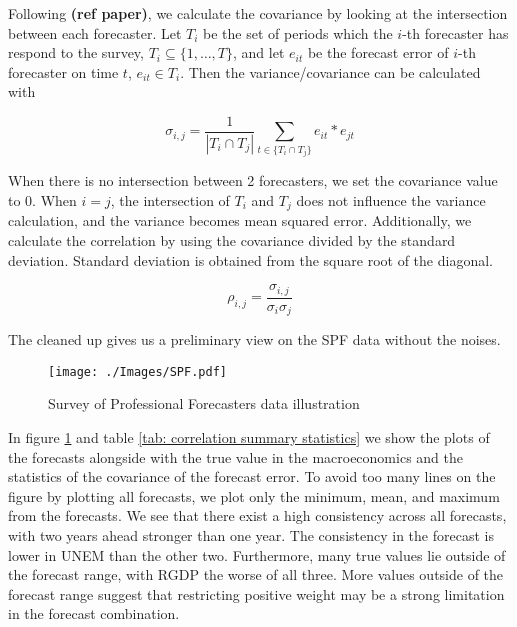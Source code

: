 \documentclass[11pt]{article}
\begin{document}
Following \textbf{(ref paper)}, we calculate the covariance by looking
at the intersection between each forecaster. Let $T_i$ be the set of periods which the $i$-th forecaster has respond to the survey, $T_i \subseteq \{1,\ldots,T\}$, and let $e_{it}$ be the forecast error of $i$-th forecaster on time $t$, $e_{it} \in T_i$. Then the variance/covariance can be calculated with

\begin{equation}
\label{equation}
\sigma_{i,j} = \frac{1}{|T_i \cap T_j|}\sum_{t\in \{T_i \cap T_j\}} e_{it}*e_{jt}
\end{equation}

When there is no intersection between 2 forecasters, we set the
covariance value to 0. When $i=j$, the intersection of $T_i$ and $T_j$ does not influence the variance calculation, and the variance becomes mean squared error. Additionally, we calculate the correlation by
using the covariance divided by the standard deviation. Standard
deviation is obtained from the square root of the diagonal.

\begin{equation}
\label{eqn: cov2cor}
\rho_{i,j} = \frac{\sigma_{i,j}}{\sigma_{i}\sigma_{j}}
\end{equation}

The cleaned up gives us a preliminary view on the SPF data without the
noises.

\begin{figure}[!h]
\centering
\texttt{[image: ./Images/SPF.pdf]}
\caption{Survey of Professional Forecasters data illustration}\label{fig: SPF data illustration}
\end{figure}

In figure \ref{fig: SPF data illustration} and table
\ref{tab: correlation summary statistics} we show the plots of the
forecasts alongside with the true value in the macroeconomics and the
statistics of the covariance of the forecast error. To avoid too many
lines on the figure by plotting all forecasts, we plot only the minimum,
mean, and maximum from the forecasts. We see that there exist a high
consistency across all forecasts, with two years ahead stronger than one
year. The consistency in the forecast is lower in UNEM than the other
two. Furthermore, many true values lie outside of the forecast range,
with RGDP the worse of all three. More values outside of the forecast
range suggest that restricting positive weight may be a strong
limitation in the forecast combination.
\end{document}
